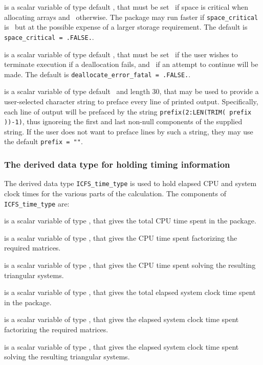 \documentclass{galahad}
\newcommand{\packagename}{ICFS}
\begin{document}
\begin{description}
 is a scalar variable of type default \logical,
that must be set \true\ if space is critical when allocating arrays
and  \false\ otherwise. The package may run faster if
{\tt space\_critical} is \false\ but at the possible expense of a larger
storage requirement. The default is {\tt space\_critical = .FALSE.}.

 is a scalar variable of type default \logical,
that must be set \true\ if the user wishes to terminate execution if
a deallocation  fails, and \false\ if an attempt to continue
will be made. The default is {\tt deallocate\_error\_fatal = .FALSE.}.

 is a scalar variable of type default \character\
and length 30, that may be used to provide a user-selected
character string to preface every line of printed output.
Specifically, each line of output will be prefaced by the string
{\tt prefix(2:LEN(TRIM( prefix ))-1)},
thus ignoreing the first and last non-null components of the
supplied string. If the user does not want to preface lines by such
a string, they may use the default {\tt prefix = ""}.

\end{description}


\subsubsection{The derived data type for holding timing
 information}\label{typetime}
The derived data type
{\tt \packagename\_time\_type}
is used to hold elapsed CPU and system clock times for the various parts of
the calculation. The components of
{\tt \packagename\_time\_type}
are:
\begin{description}
 is a scalar variable of type \realdp, that gives
 the total CPU time spent in the package.

 is a scalar variable of type \realdp, that gives
 the CPU time spent factorizing the required matrices.

 is a scalar variable of type \realdp, that gives
 the CPU time spent solving the resulting triangular systems.

 is a scalar variable of type \realdp, that gives
 the total elapsed system clock time spent in the package.

 is a scalar variable of type \realdp, that gives
 the elapsed system clock time spent factorizing the required matrices.

 is a scalar variable of type \realdp, that gives
 the elapsed system clock time spent solving the resulting triangular systems.

\end{description}
\end{document}
